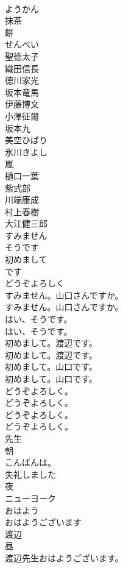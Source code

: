 \documentclass[8pt]{extreport}
\begin{document}
\begin{CJK}{UTF8}{min}
\\	ようかん
\\	抹茶
\\	餅
\\	せんべい
\\	聖徳太子
\\	織田信長
\\	徳川家光
\\	坂本竜馬
\\	伊藤博文
\\	小澤征爾
\\	坂本九
\\	美空ひばり
\\	氷川きよし
\\	嵐
\\	樋口一葉
\\	紫式部
\\	川端康成
\\	村上春樹
\\	大江健三郎
\\	すみません
\\	そうです
\\	初めまして
\\	です
\\	どうぞよろしく
\\	すみません。山口さんですか。	
\\	すみません。山口さんですか。 
\\	はい、そうです。	
\\	はい、そうです。 
\\	初めまして。渡辺です。	
\\	初めまして。渡辺です。 
\\	初めまして。山口です。	
\\	初めまして。山口です。 
\\	どうぞよろしく。	
\\	どうぞよろしく。 
\\	どうぞよろしく。	
\\	どうぞよろしく。 
\\	先生
\\	朝
\\	こんばんは。
\\	失礼しました
\\	夜
\\	ニューヨーク
\\	おはよう
\\	おはようございます
\\	渡辺
\\	昼
\\	渡辺先生おはようございます。	

\end{CJK}
\end{document}
